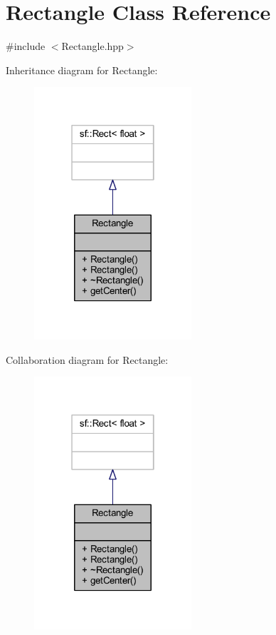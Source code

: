 \hypertarget{class_rectangle}{\section{Rectangle Class Reference}
\label{class_rectangle}
}


{\ttfamily \#include $<$Rectangle.\-hpp$>$}



Inheritance diagram for Rectangle\-:\nopagebreak
\begin{figure}[H]
\begin{center}
\leavevmode
\includegraphics[width=166pt]{class_rectangle__inherit__graph}
\end{center}
\end{figure}


Collaboration diagram for Rectangle\-:\nopagebreak
\begin{figure}[H]
\begin{center}
\leavevmode
\includegraphics[width=166pt]{class_rectangle__coll__graph}
\end{center}
\end{figure}
